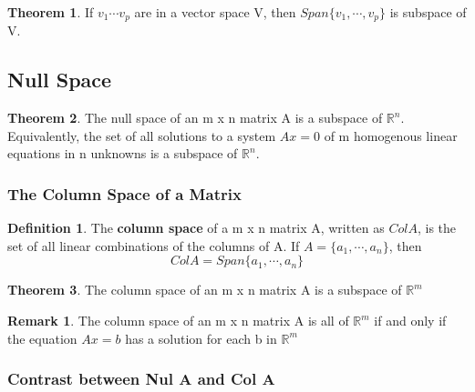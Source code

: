 \documentclass[12pt]{article}
\theoremstyle{definition}
\newtheorem{theorem}{Theorem}  %
\newtheorem{definition}{Definition} %
\newtheorem*{remark}{Remark}        %
\numberwithin{equation}{theorem}    %
\begin{document}
\begin{theorem}
    If $v_1 \cdots v_p$ are in a vector space V, then $Span\{v_1, \cdots, v_p\}$ is subspace of V.
\end{theorem}

\subsection{Null Space}

\begin{theorem}
    The null space of an m x n matrix A is a subspace of $\mathbb{R}^n$. Equivalently, the set of all solutions to a system $Ax=0$ of m homogenous linear equations in n unknowns is a subspace of $\mathbb{R}^n$.
\end{theorem}

\subsubsection{The Column Space of a Matrix}

\begin{definition}
    The \textbf{column space} of a m x n matrix A, written as $Col A$, is the set of all linear combinations of the columns of A. If $A=\{a_1, \cdots, a_n\}$, then $$Col A=Span\{a_1, \cdots, a_n\}$$
\end{definition}

\begin{theorem}
    The column space of an m x n matrix A is a subspace of $\mathbb{R}^m$
\end{theorem}

\begin{remark}
    The column space of an m x n matrix A is all of $\mathbb{R}^m$ if and only if the equation $Ax=b$ has a solution for each b in $\mathbb{R}^m$
\end{remark}

\subsubsection{Contrast between Nul A and Col A}
\end{document}
